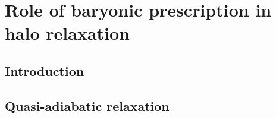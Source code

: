 \chapter{Role of baryonic prescription in halo relaxation}

\section{Introduction}

\section{Quasi-adiabatic relaxation}

\section{}